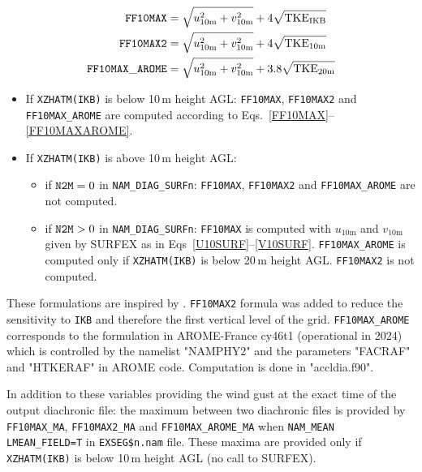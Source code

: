 \begin{eqnarray}
{\tt FF10MAX} &= \sqrt{u_\mathrm{10m}^2+v_\mathrm{10m}^2} + 4 \sqrt{\mathrm{TKE_{IKB}}} \label{FF10MAX}\\
{\tt FF10MAX2} &= \sqrt{u_\mathrm{10m}^2+v_\mathrm{10m}^2} + 4 \sqrt{\mathrm{TKE_{10m}}}\\
{\tt FF10MAX\_AROME} &= \sqrt{u_\mathrm{10m}^2+v_\mathrm{10m}^2} + 3.8 \sqrt{\mathrm{TKE_{20m}}} \label{FF10MAXAROME}
\end{eqnarray}

\begin{itemize}
\item If {\tt XZHATM(IKB)} is below 10\,m height AGL: {\tt FF10MAX}, {\tt FF10MAX2} and {\tt FF10MAX\_AROME} are computed according to Eqs.~\ref{FF10MAX}--\ref{FF10MAXAROME}.

\item If {\tt XZHATM(IKB)} is above 10\,m height AGL: 

\begin{itemize}
\item if ${\tt N2M} = 0$ in {\tt NAM\_DIAG\_SURFn}:
{\tt FF10MAX}, {\tt FF10MAX2} and {\tt FF10MAX\_AROME} are not computed.
\item if ${\tt N2M} > 0$ in {\tt NAM\_DIAG\_SURFn}:
{\tt FF10MAX} is computed with $u_\mathrm{10m}$ and $v_\mathrm{10m}$ given by SURFEX as in Eqs~\ref{U10SURF}--\ref{V10SURF}. {\tt FF10MAX\_AROME} is computed only if {\tt XZHATM(IKB)} is below 20\,m height AGL. {\tt FF10MAX2} is not computed.
\end{itemize}
\end{itemize}




These formulations are inspired by \citet{Brasseur2001}. {\tt FF10MAX2} formula was added to reduce the sensitivity to {\tt IKB} and therefore the first vertical level of the grid. {\tt FF10MAX\_AROME} corresponds to the formulation in AROME-France cy46t1 (operational in 2024) which is controlled by the namelist "NAMPHY2" and the parameters "FACRAF" and "HTKERAF" in AROME code. Computation is done in "accldia.f90".

In addition to these variables providing the wind gust at the exact time of the output diachronic file: the maximum between two diachronic files is provided by {\tt FF10MAX\_MA}, {\tt FF10MAX2\_MA} and {\tt FF10MAX\_AROME\_MA} when {\tt NAM\_MEAN LMEAN\_FIELD=T} in {\tt  EXSEG\$n.nam} file. These maxima are provided only if {\tt XZHATM(IKB)} is below 10\,m height AGL (no call to SURFEX).
%
